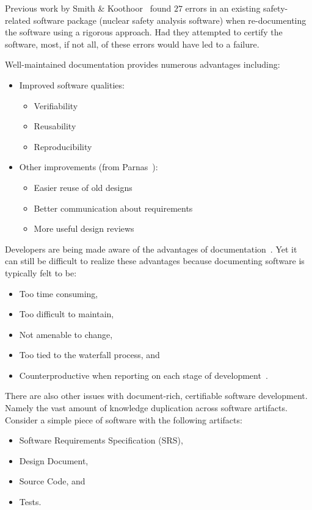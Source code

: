 \documentclass[sigconf]{acmart}
\begin{document}
Previous work by Smith \& Koothoor~\citep{SmithAndKoothoor2016} found $27$
errors in an existing safety-related software package (nuclear safety analysis
software) when re-documenting the software using a rigorous approach. Had they
attempted to certify the software, most, if not all, of these errors would have
led to a failure.

Well-maintained documentation provides numerous advantages including:
\begin{itemize}
\item Improved software qualities:
    \begin{itemize}
    \item Verifiability
    \item Reusability
    \item Reproducibility
    \end{itemize}

\item Other improvements (from Parnas~\cite{Parnas2010}):
    \begin{itemize}
        \item Easier reuse of old designs
        \item Better communication about requirements
        \item More useful design reviews
    \end{itemize}
\end{itemize}

Developers are being made aware of the advantages of 
documentation~\cite{SmithJegatheesanAndKelly2016}. Yet it can still be difficult 
to realize these advantages because documenting software is typically 
felt to be:

\begin{itemize}
\item Too time consuming,
\item Too difficult to maintain,
\item Not amenable to change,
\item Too tied to the waterfall process, and
\item Counterproductive when reporting on each stage of 
        development~\cite{Roache1998}.
\end{itemize}

There are also other issues with document-rich, certifiable software 
development. Namely the vast amount of knowledge duplication across software 
artifacts. Consider a simple piece of software with the following artifacts:

\begin{itemize}
\item Software Requirements Specification (SRS),
\item Design Document,
\item Source Code, and
\item Tests.
\end{itemize}
\end{document}
